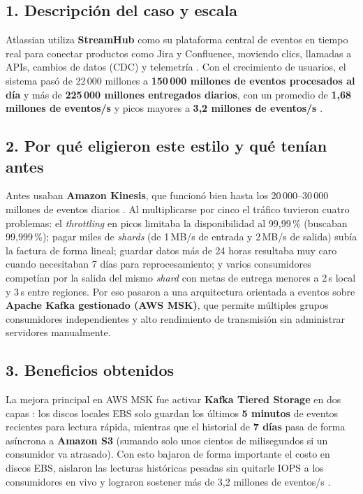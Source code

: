 \documentclass[11pt,a4paper]{article}
\begin{document}
\subsection*{1. Descripción del caso y escala}
Atlassian utiliza \textbf{StreamHub} como su plataforma central de eventos en tiempo real para conectar productos como Jira y Confluence, moviendo clics, llamadas a APIs, cambios de datos (CDC) y telemetría \cite{kava2026streamhub}. Con el crecimiento de usuarios, el sistema pasó de 22\,000 millones a \textbf{150\,000 millones de eventos procesados al día} y más de \textbf{225\,000 millones entregados diarios}, con un promedio de \textbf{1,68 millones de eventos/s} y picos mayores a \textbf{3,2 millones de eventos/s} \cite{kava2026streamhub}.

\subsection*{2. Por qué eligieron este estilo y qué tenían antes}
Antes usaban \textbf{Amazon Kinesis}, que funcionó bien hasta los 20\,000--30\,000 millones de eventos diarios \cite{kava2026streamhub}. Al multiplicarse por cinco el tráfico tuvieron cuatro problemas: el \textit{throttling} en picos limitaba la disponibilidad al 99,99\,\% (buscaban 99,999\,\%); pagar miles de \textit{shards} (de 1\,MB/s de entrada y 2\,MB/s de salida) subía la factura de forma lineal; guardar datos más de 24 horas resultaba muy caro cuando necesitaban 7 días para reprocesamiento; y varios consumidores competían por la salida del mismo \textit{shard} con metas de entrega menores a 2\,s local y 3\,s entre regiones. Por eso pasaron a una arquitectura orientada a eventos sobre \textbf{Apache Kafka gestionado (AWS MSK)}, que permite múltiples grupos consumidores independientes \cite{raptis2023kafka} y alto rendimiento de transmisión \cite{jackson2024streaming} sin administrar servidores manualmente.

\subsection*{3. Beneficios obtenidos}
La mejora principal en AWS MSK fue activar \textbf{Kafka Tiered Storage} en dos capas \cite{kava2026streamhub}: los discos locales EBS solo guardan los últimos \textbf{5 minutos} de eventos recientes para lectura rápida, mientras que el historial de \textbf{7 días} pasa de forma asíncrona a \textbf{Amazon S3} (sumando solo unos cientos de milisegundos si un consumidor va atrasado). Con esto bajaron de forma importante el costo en discos EBS, aislaron las lecturas históricas pesadas sin quitarle IOPS a los consumidores en vivo y lograron sostener más de 3,2 millones de eventos/s \cite{kava2026streamhub}.
\end{document}
